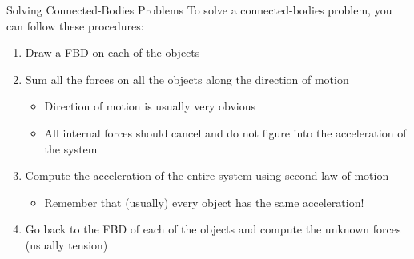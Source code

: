 \documentclass[12pt,compress,aspectratio=169]{beamer}
\begin{document}
\begin{frame}{Solving Connected-Bodies Problems}
  To solve a connected-bodies problem, you can follow these procedures:
  \begin{enumerate}
  \item Draw a FBD on each of the objects
  \item Sum all the forces on all the objects along the direction of motion
    \begin{itemize}
    \item Direction of motion is usually very obvious
    \item All internal forces should cancel and do not figure into the
      acceleration of the system
    \end{itemize}
  \item Compute the acceleration of the entire system using second law of motion
    \begin{itemize}
    \item Remember that (usually) every object has the same acceleration!
    \end{itemize}
  \item Go back to the FBD of each of the objects and compute the unknown
    forces (usually tension)
  \end{enumerate}
\end{frame}



\end{document}
